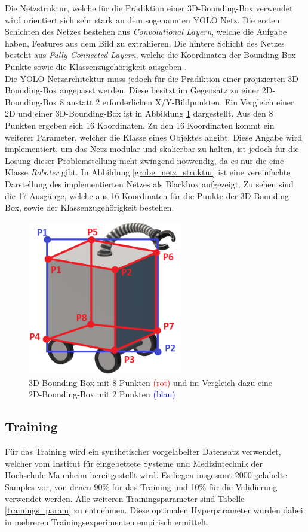 Die Netzstruktur, welche für die Prädiktion einer 3D-Bounding-Box verwendet wird orientiert sich sehr stark an dem sogenannten YOLO Netz. Die ersten Schichten des Netzes bestehen aus \textit{Convolutional Layern}, welche die Aufgabe haben, Features aus dem Bild zu extrahieren. Die hintere Schicht des Netzes besteht aus  \textit{Fully Connected Layern}, welche die Koordinaten der Bounding-Box Punkte sowie die Klassenzugehörigkeit  ausgeben \cite{Redmon2016}. \\Die YOLO Netzarchitektur muss jedoch für die Prädiktion einer projizierten 3D Bounding-Box angepasst werden. Diese besitzt im Gegensatz zu einer 2D-Bounding-Box 8 anstatt 2 erforderlichen X/Y-Bildpunkten. Ein Vergleich einer 2D und einer 3D-Bounding-Box ist in Abbildung \ref{3D_Bounding_roboter} dargestellt. Aus den 8 Punkten ergeben sich 16 Koordinaten. Zu den 16 Koordinaten kommt ein weiterer Parameter, welcher die Klasse eines Objektes angibt. Diese Angabe wird implementiert, um das Netz modular und skalierbar zu halten, ist jedoch für die Lösung dieser Problemstellung nicht zwingend notwendig, da es nur die eine Klasse \textit{Roboter} gibt. In Abbildung \ref{grobe_netz_struktur} ist eine vereinfachte Darstellung des implementierten Netzes als Blackbox aufgezeigt. Zu sehen sind die 17 Ausgänge, welche aus 16 Koordinaten für die Punkte der 3D-Bounding-Box, sowie der Klassenzugehörigkeit bestehen.

\begin{figure}[!htb]
  \centering
  \includegraphics[width=6.8cm]{Abb/3d_robotter_mit_boundig_box_2d_vs_3d.PNG}
  \caption{3D-Bounding-Box mit 8 Punkten \textcolor{red}{(rot)} und im Vergleich dazu eine 2D-Bounding-Box mit 2 Punkten \textcolor{blue}{(blau)} }
  \label{3D_Bounding_roboter}
\end{figure} 

\newpage
\subsection{Training}
Für das Training wird ein synthetischer vorgelabelter Datensatz verwendet, welcher vom Institut für eingebettete Systeme und Medizintechnik der Hochschule Mannheim bereitgestellt wird. Es liegen insgesamt 2000 gelabelte Samples vor, von denen 90\% für das Training und 10\% für die Validierung verwendet werden. Alle weiteren Trainingsparameter sind Tabelle \ref{trainings_param} zu entnehmen. Diese optimalen Hyperparameter wurden dabei in mehreren Trainingsexperimenten empirisch ermittelt.\\

